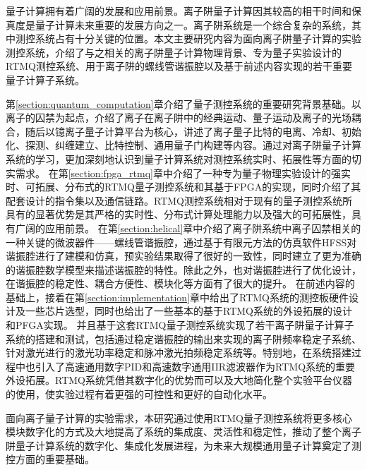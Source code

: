 
\begin{conclusion}

量子计算拥有着广阔的发展和应用前景。离子阱量子计算因其较高的相干时间和保真度是量子计算未来重要的发展方向之一。离子阱系统是一个综合复杂的系统，其中测控系统占有十分关键的位置。本文主要研究内容为面向离子阱量子计算的实验测控系统，介绍了与之相关的离子阱量子计算物理背景、专为量子实验设计的RTMQ测控系统、用于离子阱的螺线管谐振腔以及基于前述内容实现的若干重要量子计算子系统。

第\ref{section:quantum_computation}章介绍了量子测控系统的重要研究背景基础。以离子的囚禁为起点，介绍了离子在离子阱中的经典运动、量子运动及离子的光场耦合，随后以镱离子量子计算平台为核心，讲述了离子量子比特的电离、冷却、初始化、探测、纠缠建立、比特控制、通用量子门构建等内容。通过对离子阱量子计算系统的学习，更加深刻地认识到量子计算系统对测控系统实时、拓展性等方面的切实需求。
在第\ref{section:fpga_rtmq}章中介绍了一种专为量子物理实验设计的强实时、可拓展、分布式的RTMQ量子测控系统和其基于FPGA的实现，同时介绍了其配套设计的指令集以及通信链路。RTMQ测控系统相对于现有的量子测控系统所具有的显著优势是其严格的实时性、分布式计算处理能力以及强大的可拓展性，具有广阔的应用前景。
在第\ref{section:helical}章中介绍了离子阱系统中离子囚禁相关的一种关键的微波器件——螺线管谐振腔，通过基于有限元方法的仿真软件HFSS对谐振腔进行了建模和仿真，预实验结果取得了很好的一致性，同时建立了更为准确的谐振腔数学模型来描述谐振腔的特性。除此之外，也对谐振腔进行了优化设计，在谐振腔的稳定性、耦合方便性、模块化等方面有了很大的提升。
在前述内容的基础上，接着在第\ref{section:implementation}章中给出了RTMQ系统的测控板硬件设计及一些芯片选型，同时也给出了一些基本的基于RTMQ系统的外设拓展的设计和PFGA实现。
并且基于这套RTMQ量子测控系统实现了若干离子阱量子计算子系统的搭建和测试，包括通过稳定谐振腔的输出来实现的离子阱频率稳定子系统、针对激光进行的激光功率稳定和脉冲激光拍频稳定系统等。特别地，在系统搭建过程中也引入了高速通用数字PID和高速数字通用IIR滤波器作为RTMQ系统的重要外设拓展。RTMQ系统凭借其数字化的优势而可以及大地简化整个实验平台仪器的使用，使实验过程有着更强的可控性和更好的自动化水平。

面向离子量子计算的实验需求，本研究通过使用RTMQ量子测控系统将更多核心模块数字化的方式及大地提高了系统的集成度、灵活性和稳定性，推动了整个离子阱量子计算系统的数字化、集成化发展进程，为未来大规模通用量子计算奠定了测控方面的重要基础。

\end{conclusion}


